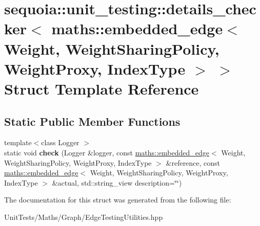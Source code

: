 \hypertarget{structsequoia_1_1unit__testing_1_1details__checker_3_01maths_1_1embedded__edge_3_01_weight_00_010e62aa522478f85fc35401de49b2b56e}{}\section{sequoia\+::unit\+\_\+testing\+::details\+\_\+checker$<$ maths\+::embedded\+\_\+edge$<$ Weight, Weight\+Sharing\+Policy, Weight\+Proxy, Index\+Type $>$ $>$ Struct Template Reference}
\label{structsequoia_1_1unit__testing_1_1details__checker_3_01maths_1_1embedded__edge_3_01_weight_00_010e62aa522478f85fc35401de49b2b56e}
\subsection*{Static Public Member Functions}
\begin{DoxyCompactItemize}
\item 
\mbox{\label{structsequoia_1_1unit__testing_1_1details__checker_3_01maths_1_1embedded__edge_3_01_weight_00_010e62aa522478f85fc35401de49b2b56e_a5552a67c37b54bdfd4b2be74b22f6b02}} 
{\footnotesize template$<$class Logger $>$ }\\static void {\bfseries check} (Logger \&logger, const \mbox{\hyperlink{classsequoia_1_1maths_1_1embedded__edge}{maths\+::embedded\+\_\+edge}}$<$ Weight, Weight\+Sharing\+Policy, Weight\+Proxy, Index\+Type $>$ \&reference, const \mbox{\hyperlink{classsequoia_1_1maths_1_1embedded__edge}{maths\+::embedded\+\_\+edge}}$<$ Weight, Weight\+Sharing\+Policy, Weight\+Proxy, Index\+Type $>$ \&actual, std\+::string\+\_\+view description=\char`\"{}\char`\"{})
\end{DoxyCompactItemize}


The documentation for this struct was generated from the following file\+:\begin{DoxyCompactItemize}
\item 
Unit\+Tests/\+Maths/\+Graph/Edge\+Testing\+Utilities.\+hpp\end{DoxyCompactItemize}
